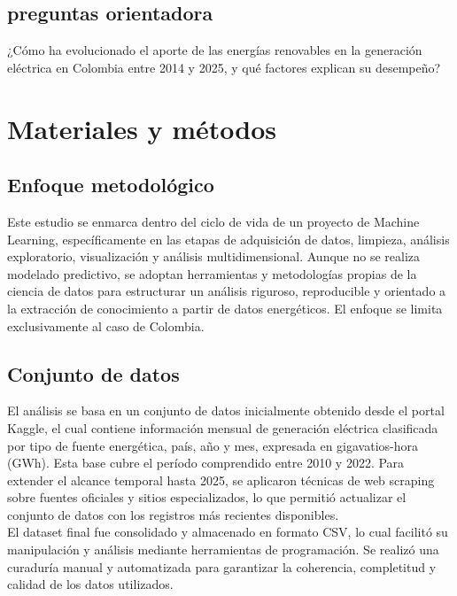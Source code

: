 \documentclass{article}
\begin{document}
\subsection{preguntas orientadora}

¿Cómo ha evolucionado el aporte de las energías renovables en la generación eléctrica en Colombia entre 2014 y 2025, y qué factores explican su desempeño?


\section{Materiales y métodos}

\subsection{Enfoque metodológico}

Este estudio se enmarca dentro del ciclo de vida de un proyecto de Machine Learning, específicamente en las etapas de adquisición de datos, limpieza, análisis exploratorio, visualización y análisis multidimensional. Aunque no se realiza modelado predictivo, se adoptan herramientas y metodologías propias de la ciencia de datos para estructurar un análisis riguroso, reproducible y orientado a la extracción de conocimiento a partir de datos energéticos. El enfoque se limita exclusivamente al caso de Colombia.

\subsection{Conjunto de datos}

El análisis se basa en un conjunto de datos inicialmente obtenido desde el portal Kaggle, el cual contiene información mensual de generación eléctrica clasificada por tipo de fuente energética, país, año y mes, expresada en gigavatios-hora (GWh). Esta base cubre el período comprendido entre 2010 y 2022. Para extender el alcance temporal hasta 2025, se aplicaron técnicas de web scraping sobre fuentes oficiales y sitios especializados, lo que permitió actualizar el conjunto de datos con los registros más recientes disponibles.\\

El dataset final fue consolidado y almacenado en formato CSV, lo cual facilitó su manipulación y análisis mediante herramientas de programación. Se realizó una curaduría manual y automatizada para garantizar la coherencia, completitud y calidad de los datos utilizados.\\
\end{document}
